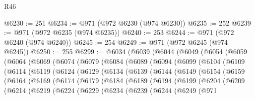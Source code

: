 \begin{lexlean}{R46}
\begin{coremodule}
@6230 := 251
@6234 := @971 (@972 @6230 (@974 @6230))
@6235 := 252
@6239 := @971 (@972 @6235 (@974 @6235))
@6240 := 253
@6244 := @971 (@972 @6240 (@974 @6240))
@6245 := 254
@6249 := @971 (@972 @6245 (@974 @6245))
@6250 := 255
@6299 := @6034
    (@6039
      (@6044
        (@6049
          (@6054
            (@6059
              (@6064
                (@6069
                  (@6074
                    (@6079
                      (@6084
                        (@6089
                          (@6094
                            (@6099
                              (@6104
                                (@6109
                                  (@6114
                                    (@6119
                                      (@6124
                                        (@6129
                                          (@6134
                                            (@6139
                                              (@6144
                                                (@6149
                                                  (@6154
                                                    (@6159
                                                      (@6164
                                                        (@6169
                                                          (@6174
                                                            (@6179
                                                              (@6184
                                                                (@6189
                                                                  (@6194
                                                                    (@6199
                                                                      (@6204
                                                                        (@6209
                                                                          (@6214
                                                                            (@6219
                                                                              (@6224
                                                                                (@6229
                                                                                  (@6234
                                                                                    (@6239
                                                                                      (@6244
                                                                                        (@6249
                                                                                          (@971

\end{coremodule}
\end{lexlean}
